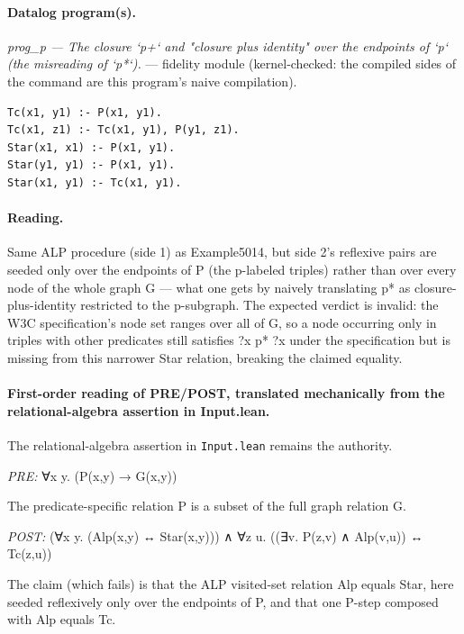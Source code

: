 \documentclass[10pt]{article}
\begin{document}
\paragraph{Datalog program(s).}

{\raggedright\textit{prog\_p --- The closure `p+` and "closure plus identity" over the endpoints of `p` (the misreading of `p*`).} --- fidelity module (kernel-checked: the compiled sides of the command are this program's naive compilation).\par}

\begin{Verbatim}[fontsize=\scriptsize,breaklines=true,breakanywhere=true,frame=single,framesep=1.5mm]
Tc(x1, y1) :- P(x1, y1).
Tc(x1, z1) :- Tc(x1, y1), P(y1, z1).
Star(x1, x1) :- P(x1, y1).
Star(y1, y1) :- P(x1, y1).
Star(x1, y1) :- Tc(x1, y1).
\end{Verbatim}

\paragraph{Reading.} Same ALP procedure (side 1) as Example5014, but side 2's reflexive pairs are seeded only over the endpoints of P (the p-labeled triples) rather than over every node of the whole graph G --- what one gets by naively translating p* as closure-plus-identity restricted to the p-subgraph. The expected verdict is invalid: the W3C specification's node set ranges over all of G, so a node occurring only in triples with other predicates still satisfies ?x p* ?x under the specification but is missing from this narrower Star relation, breaking the claimed equality.

\paragraph{First-order reading of PRE/POST, translated mechanically from the relational-algebra assertion in Input.lean.} The relational-algebra assertion in \texttt{Input.lean} remains the authority.

\textit{PRE:} ∀x y. (P(x,y) → G(x,y))\par The predicate-specific relation P is a subset of the full graph relation G.

\textit{POST:} (∀x y. (Alp(x,y) ↔ Star(x,y))) ∧ ∀z u. ((∃v. P(z,v) ∧ Alp(v,u)) ↔ Tc(z,u))\par The claim (which fails) is that the ALP visited-set relation Alp equals Star, here seeded reflexively only over the endpoints of P, and that one P-step composed with Alp equals Tc.
\end{document}
